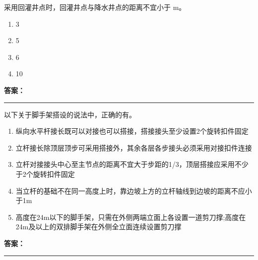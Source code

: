 \documentclass[UTF8,fontset=fandol,11pt]{ctexart}
\newcommand{\answerline}{\textcolor{answerred}{\rule{2.4cm}{0.7pt}}}
\begin{document}
\begin{quizbox}[title={乱序第 109 题｜第三章基坑工程}]

采用回灌井点时，回灌井点与降水井点的距离不宜小于 m。\\

\begin{enumerate}[label=\Alph*.]

\item 3

\item 5

\item 6

\item 10

\end{enumerate}

\textbf{\textcolor{answerred}{答案：}} \answerline

\end{quizbox}

\vspace{0.2em}

\begin{quizbox}[title={乱序第 110 题｜第七章脚手架工程}]

以下关于脚手架搭设的说法中，正确的有。\\

\begin{enumerate}[label=\Alph*.]

\item 纵向水平杆接长既可以对接也可以搭接，搭接接头至少设置2个旋转扣件固定

\item 立杆接长除顶层顶步可采用搭接外，其余各层各步接头必须采用对接扣件连接

\item 立杆对接接头中心至主节点的距离不宜大于步距的1/3，顶层搭接应采用不少于2个旋转扣件固定

\item 当立杆的基础不在同一高度上时，靠边坡上方的立杆轴线到边坡的距离不应小于1m

\item 高度在24m以下的脚手架，只需在外侧两端立面上各设置一道剪刀撑;高度在24m及以上的双排脚手架在外侧全立面连续设置剪刀撑

\end{enumerate}

\textbf{\textcolor{answerred}{答案：}} \answerline

\end{quizbox}
\end{document}
